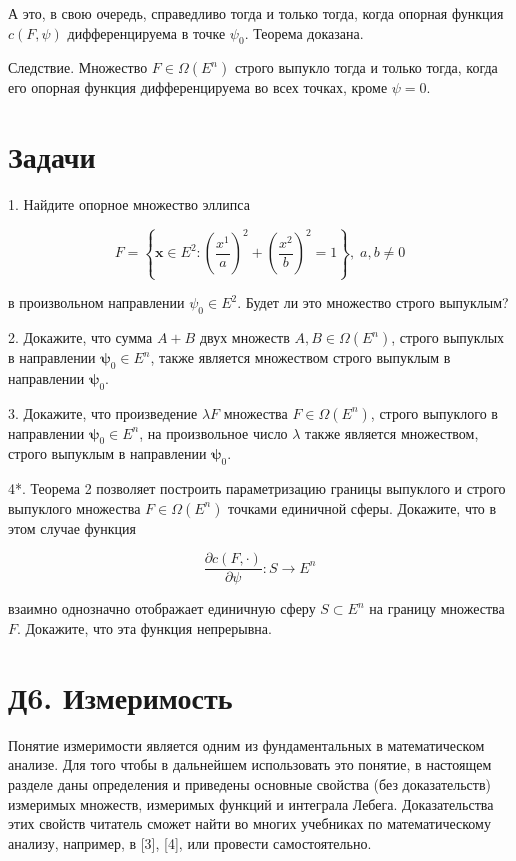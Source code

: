 \documentclass[8pt]{extarticle}
\begin{document}
А это, в свою очередь, справедливо тогда и только тогда, когда опорная функция \(c\left( {F,\psi }\right)\) дифференцируема в точке \({\psi }_{0}\). Теорема доказана.

Следствие. Множество \(F \in  \Omega \left( {E}^{n}\right)\) строго выпукло тогда и только тогда, когда его опорная функция дифференцируема во всех точках, кроме \(\psi  = 0\).

\section*{Задачи}

1. Найдите опорное множество эллипса

\[
F = \left\{  {\mathbf{x} \in  {E}^{2} : {\left( \frac{{x}^{1}}{a}\right) }^{2} + {\left( \frac{{x}^{2}}{b}\right) }^{2} = 1}\right\}  ,\;a,b \neq  0
\]

в произвольном направлении \({\psi }_{0} \in  {E}^{2}\). Будет ли это множество строго выпуклым?

2. Докажите, что сумма \(A + B\) двух множеств \(A,B \in  \Omega \left( {E}^{n}\right)\), строго выпуклых в направлении \({\mathbf{\psi }}_{0} \in  {E}^{n}\), также является множеством строго выпуклым в направлении \({\mathbf{\psi }}_{0}\).

3. Докажите, что произведение \(\lambda F\) множества \(F \in  \Omega \left( {E}^{n}\right)\), строго выпуклого в направлении \({\mathbf{\psi }}_{0} \in  {E}^{n}\), на произвольное число \(\lambda\) также является множеством, строго выпуклым в направлении \({\mathbf{\psi }}_{0}\).

4*. Теорема 2 позволяет построить параметризацию границы выпуклого и строго выпуклого множества \(F \in  \Omega \left( {E}^{n}\right)\) точками единичной сферы. Докажите, что в этом случае функция

\[
\frac{\partial c\left( {F, \cdot  }\right) }{\partial \psi } : S \rightarrow  {E}^{n}
\]

взаимно однозначно отображает единичную сферу \(S \subset  {E}^{n}\) на границу множества \(F\). Докажите, что эта функция непрерывна.

\section*{Д6. Измеримость}

Понятие измеримости является одним из фундаментальных в математическом анализе. Для того чтобы в дальнейшем использовать это понятие, в настоящем разделе даны определения и приведены основные свойства (без доказательств) измеримых множеств, измеримых функций и интеграла Лебега. Доказательства этих свойств читатель сможет найти во многих учебниках по математическому анализу, например, в [3], [4], или провести самостоятельно.
\end{document}
